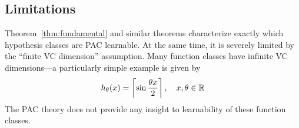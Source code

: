 \subsection{Limitations}

Theorem~\ref{thm:fundamental} and similar theorems characterize exactly which
hypothesis classes are PAC learnable. At the same time, it is severely limited
by the ``finite VC dimension'' assumption. Many function classes have infinite
VC dimensions---a particularly simple example is given by
\begin{equation}
  h_\theta(x) = \left\lceil \sin\frac{\theta x}{2} \right\rceil, \quad x, \theta
  \in \mathbb{R}
\end{equation}
The PAC theory does not provide any insight to learnability of these function
classes.
